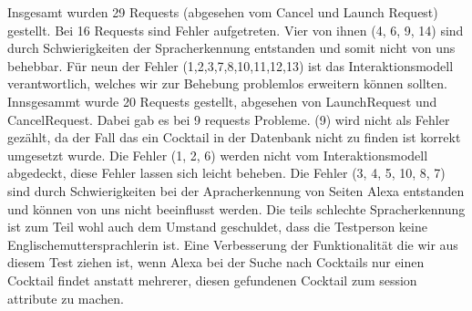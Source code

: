 \documentclass[12pt,letterpaper]{article}
\begin{document}
Insgesamt wurden 29 Requests (abgesehen vom Cancel und Launch Request) gestellt. Bei 16 Requests sind Fehler aufgetreten. Vier von ihnen (4, 6, 9, 14) sind durch Schwierigkeiten der Spracherkennung entstanden und somit nicht von uns behebbar. Für neun der Fehler (1,2,3,7,8,10,11,12,13) ist das Interaktionsmodell verantwortlich, welches wir zur Behebung problemlos erweitern können sollten. 
Innsgesammt wurde 20 Requests gestellt, abgesehen von LaunchRequest und CancelRequest. Dabei gab es bei 9 requests Probleme. (9) wird nicht als Fehler gezählt, da der Fall das ein Cocktail in der Datenbank nicht zu finden ist korrekt umgesetzt wurde. Die Fehler (1, 2, 6) werden nicht vom Interaktionsmodell abgedeckt, diese Fehler lassen sich leicht beheben. Die Fehler (3, 4, 5, 10, 8, 7) sind durch Schwierigkeiten bei der Apracherkennung von Seiten Alexa entstanden und können von uns nicht beeinflusst werden. Die teils schlechte Spracherkennung ist zum Teil wohl auch dem Umstand geschuldet, dass die Testperson keine Englischemuttersprachlerin ist.
Eine Verbesserung der Funktionalität die wir aus diesem Test ziehen ist, wenn Alexa bei der Suche nach Cocktails nur einen Cocktail findet anstatt mehrerer, diesen gefundenen Cocktail zum session attribute zu machen. \\
\end{document}
